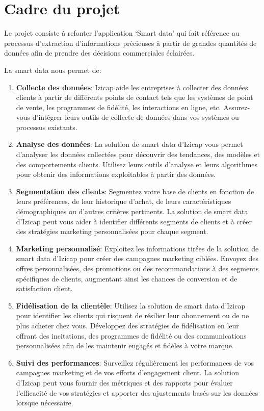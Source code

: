 \section{Cadre du projet}

Le projet consiste à refonter l'application `Smart data' qui fait référence au processus d'extraction d'informations précieuses à partir de grandes quantités de données afin de prendre des décisions commerciales éclairées.

La smart data nous permet de:

\begin{enumerate}
    \item \textbf{Collecte des données}: Izicap aide les entreprises à collecter des données clients à partir de différents points de contact tels que les systèmes de point de vente, les programmes de fidélité, les interactions en ligne, etc. Assurez-vous d'intégrer leurs outils de collecte de données dans vos systèmes ou processus existants.
    \item \textbf{Analyse des données}: La solution de smart data d'Izicap vous permet d'analyser les données collectées pour découvrir des tendances, des modèles et des comportements clients. Utilisez leurs outils d'analyse et leurs algorithmes pour obtenir des informations exploitables à partir des données.
    \item \textbf{Segmentation des clients}: Segmentez votre base de clients en fonction de leurs préférences, de leur historique d'achat, de leurs caractéristiques démographiques ou d'autres critères pertinents. La solution de smart data d'Izicap peut vous aider à identifier différents segments de clients et à créer des stratégies marketing personnalisées pour chaque segment.
    \item \textbf{Marketing personnalisé}: Exploitez les informations tirées de la solution de smart data d'Izicap pour créer des campagnes marketing ciblées. Envoyez des offres personnalisées, des promotions ou des recommandations à des segments spécifiques de clients, augmentant ainsi les chances de conversion et de satisfaction client.
    \item \textbf{Fidélisation de la clientèle}: Utilisez la solution de smart data d'Izicap pour identifier les clients qui risquent de résilier leur abonnement ou de ne plus acheter chez vous. Développez des stratégies de fidélisation en leur offrant des incitations, des programmes de fidélité ou des communications personnalisées afin de les maintenir engagés et fidèles à votre marque.
    \item \textbf{Suivi des performances}: Surveillez régulièrement les performances de vos campagnes marketing et de vos efforts d'engagement client. La solution d'Izicap peut vous fournir des métriques et des rapports pour évaluer l'efficacité de vos stratégies et apporter des ajustements basés sur les données lorsque nécessaire.

\end{enumerate}

